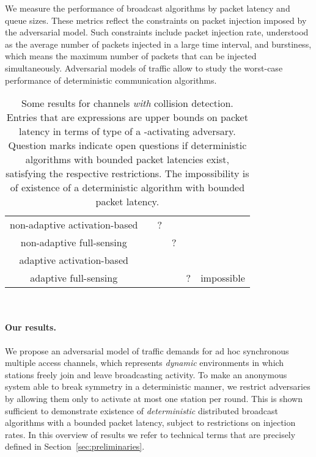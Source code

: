 \documentclass[11pt]{article}
\newcommand{\BBB}{\vspace*{-\bigskipamount}}
\newcommand{\Paragraph}[1]{\BBB\paragraph{#1}}
\newlength{\pagewidth}
\newcommand{\RB}{\raisebox{2.5ex}{~}}
\newcommand{\LB}{\raisebox{-1.5ex}{~}}
\begin{document}
We measure the performance of broadcast algorithms by packet latency and queue sizes. 
These metrics reflect the constraints on packet injection imposed by the adversarial model.
Such constraints include packet injection rate, understood as the average number of packets injected in a large time interval, and burstiness, which means the maximum number of packets that can be injected simultaneously.
Adversarial models of traffic allow to study the worst-case performance of deterministic communication algorithms.




\begin{table}
\begin{center}
\begin{tabular}{|c ||c |c |c |c |c |}
\hline
\RB \LB
&  &  &  
&&\\
\hline\hline
\RB \LB
\textsf{non-adaptive activation-based } &  & ? &  && \\
\hline
\RB
\textsf{non-adaptive full-sensing }&&  & ? && \\
\hline
\RB \LB
\textsf{adaptive activation-based } & & &&& \\
\hline
\RB \LB
\textsf{adaptive full-sensing } & & &&?& impossible\\
\hline
\end{tabular}
\parbox{\pagewidth}{
~
\caption{\label{tab:collision-detection}
Some results for channels \emph{with} collision detection.
Entries that are expressions are upper bounds on packet latency in terms of type  of a -activating adversary.
Question marks indicate open questions  if deterministic algorithms with bounded packet latencies exist, satisfying the respective restrictions.
The impossibility is of existence of a deterministic algorithm with bounded packet latency.
}}
\end{center}
\end{table}




\Paragraph{Our results.}




We propose an adversarial model of traffic demands for ad hoc synchronous multiple access channels, which represents \emph{dynamic} environments in which stations freely join and leave broadcasting activity.
To make an anonymous system able to break symmetry in a deterministic manner, we restrict adversaries by allowing them only to activate at most one station per round.
This is shown sufficient to demonstrate existence of \emph{deterministic} distributed broadcast algorithms with a bounded packet latency, subject to restrictions on injection rates.
In this overview of results we refer to technical terms that are precisely defined in Section~\ref{sec:preliminaries}.
\end{document}

